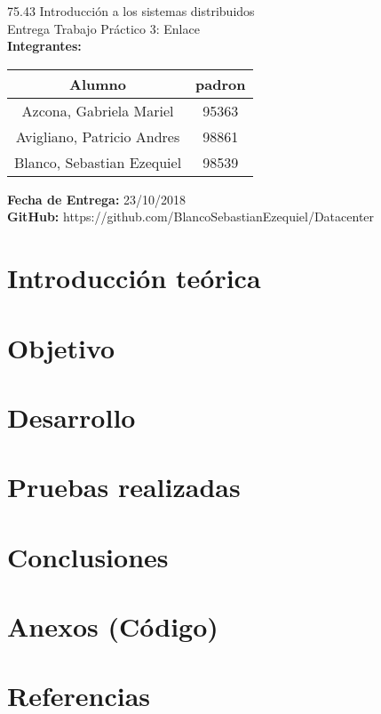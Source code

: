 
%

		
	\begin{titlepage}
		\vspace*{\fill}
		\begin{center}
			\Large 75.43 Introducción a los sistemas distribuidos \\
			\Huge Entrega Trabajo Práctico 3: Enlace \\
			\bigskip\bigskip\bigskip
			\large\textbf{Integrantes:} \\
			\begin{center}
				\begin{tabular}{||c | c||} 
					\hline
					Alumno & padron \\ [0.5ex] 
					\hline\hline
					Azcona, Gabriela Mariel & 95363 \\
					\hline
					Avigliano, Patricio Andres & 98861 \\
					\hline
					Blanco, Sebastian Ezequiel & 98539 \\
					\hline
				\end{tabular}
			\end{center}
			\textbf{Fecha de Entrega:} 23/10/2018\\
			\textbf{GitHub:} https://github.com/BlancoSebastianEzequiel/Datacenter\\

		\end{center}
		\vspace*{\fill}
	\end{titlepage}
	\newpage
			
	\tableofcontents
	\newpage
	\section{Introducción teórica}
		

	\newpage
	\section{Objetivo}
		

	\newpage
	\section{Desarrollo}
		

	\newpage
	\section{Pruebas realizadas}
		

	\newpage
	\section{Conclusiones}
		

	\newpage
	\section{Anexos (Código)}
		

	\newpage
	\section{Referencias}
		

